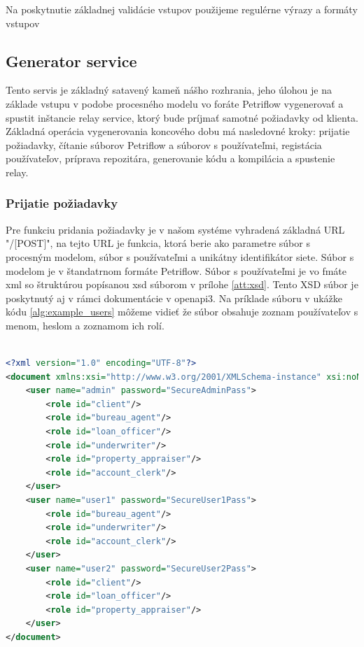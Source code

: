 Na poskytnutie základnej validácie vstupov použijeme regulérne výrazy a formáty vstupov


  

\subsection{Generator service} 
Tento servis je základný satavený kameň nášho rozhrania, jeho úlohou je na základe vstupu v podobe procesného modelu vo foráte Petriflow vygenerovať a spustit inštancie relay service, ktorý bude príjmať samotné požiadavky od klienta. Základná operácia vygenerovania koncového dobu má nasledovné kroky: 
prijatie požiadavky, 
čítanie súborov Petriflow a súborov s používateľmi, 
registácia používateľov,
príprava repozitára,
generovanie kódu 
a kompilácia a spustenie relay.

\subsubsection{Prijatie požiadavky}
Pre funkciu pridania požiadavky je v našom systéme vyhradená základná URL "/[POST]", na tejto URL je funkcia, ktorá berie ako parametre súbor s procesným modelom, súbor s používateľmi a unikátny identifikátor siete. Súbor s modelom je v štandatrnom formáte Petriflow. Súbor s používateľmi je vo fmáte \acrshort{xml} so štruktúrou popísanou \acrshort{xsd} súborom v prílohe \ref{att:xsd}. Tento XSD súbor je poskytnutý aj v rámci dokumentácie v \acrshort{openapi3}. Na príklade súboru v ukážke kódu \ref{alg:example_users} môžeme vidieť že súbor obsahuje zoznam používateľov s menom, heslom a zoznamom ich rolí.

\begin{lstlisting}[float, caption={Príklad súboru s používateľmi},label={alg:example_users},language=XML]

<?xml version="1.0" encoding="UTF-8"?>
<document xmlns:xsi="http://www.w3.org/2001/XMLSchema-instance" xsi:noNamespaceSchemaLocation="./users_schema.xsd">
	<user name="admin" password="SecureAdminPass">
		<role id="client"/>
		<role id="bureau_agent"/>
		<role id="loan_officer"/>
		<role id="underwriter"/>
		<role id="property_appraiser"/>
		<role id="account_clerk"/>
	</user>
	<user name="user1" password="SecureUser1Pass">
		<role id="bureau_agent"/>
		<role id="underwriter"/>
		<role id="account_clerk"/>
	</user>
	<user name="user2" password="SecureUser2Pass">
		<role id="client"/>
		<role id="loan_officer"/>
		<role id="property_appraiser"/>
	</user>
</document>
\end{lstlisting}



